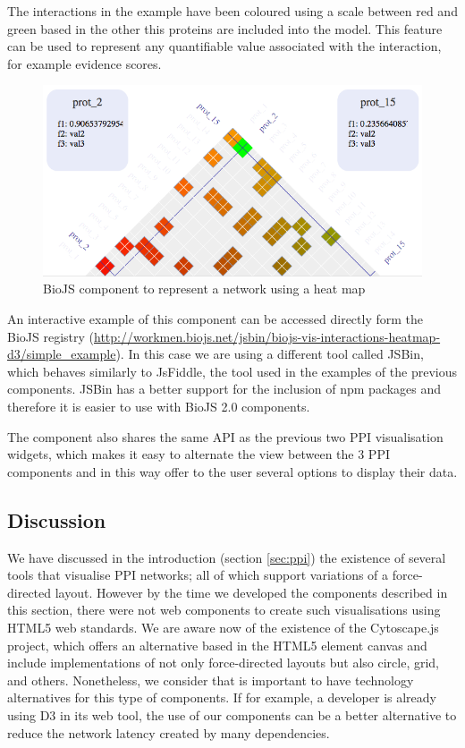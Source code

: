 The interactions in the example have been coloured using a scale between red and green based in the other this proteins are included into the model. This feature can be used to represent any quantifiable value associated with the interaction, for example evidence scores.

\begin{figure}[ht]
\centering
\includegraphics[width=\textwidth]{figures/heatmap.png}
\caption[BioJS component to represent a network using a heat map]{BioJS component to represent a network using a heat map
\label{fig:biojs_heatmap}}
\end{figure}

An interactive example of this component can be accessed directly form the BioJS registry (\url{http://workmen.biojs.net/jsbin/biojs-vis-interactions-heatmap-d3/simple_example}). In this case we are using a different tool called JSBin, which behaves similarly to JsFiddle, the tool used in the examples of the previous components. JSBin has a better support for the inclusion of npm packages and therefore it is easier to use with BioJS 2.0 components.

The component also shares the same API as the previous two PPI visualisation widgets, which makes it easy to alternate the view between the 3 PPI components and in this way offer to the user several options to display their data.


\subsection{Discussion}
We have discussed in the introduction (section \ref{sec:ppi}) the existence of several tools that visualise PPI networks; all of which support variations of a force-directed layout. However by the time we developed the components described in this section, there were not web components to create such visualisations using HTML5 web standards. We are aware now of the existence of the Cytoscape.js project, which offers an alternative based in the HTML5 element canvas and include implementations of not only force-directed layouts but also circle, grid, and others. Nonetheless, we consider that is important to have technology alternatives  for this type of components. If for example, a developer is already using D3 in its web tool, the use of our components can be a better alternative to reduce the network latency created by many dependencies.

